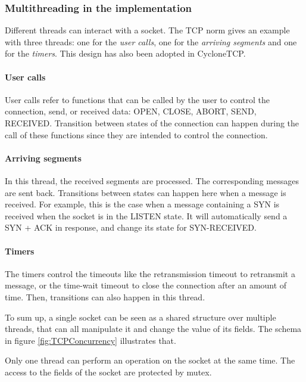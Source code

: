 \documentclass[a4paper, 10pt]{article}
\begin{document}
    \subsubsection{Multithreading in the implementation}

    Different threads can interact with a socket. The TCP norm gives an example with
    three threads: one for the \emph{user calls}, one for the \emph{arriving segments}
    and one for the \emph{timers}. This design has also been adopted in CycloneTCP.
    
    \paragraph{User calls}
    User calls refer to functions that can be called by the user to control the connection,
    send, or received data: OPEN, CLOSE, ABORT, SEND, RECEIVED. Transition between states of
    the connection can happen during the call of these functions since they are intended to control
    the connection.

    \paragraph{Arriving segments}
    In this thread, the received segments are processed. The corresponding messages are sent back.
    Transitions between states can happen here when a message is received. For example,
    this is the case when a message containing a SYN is received when the socket is in
    the LISTEN state. It will automatically send a SYN + ACK in response, and change
    its state for SYN-RECEIVED.

    \paragraph{Timers}
    The timers control the timeouts like the retransmission timeout to retransmit a message, or
    the time-wait timeout to close the connection after an amount of time. Then, transitions can also
    happen in this thread.

    To sum up, a single socket can be seen as a shared structure over multiple threads, that can all
    manipulate it and change the value of its fields. The schema in figure \ref{fig:TCPConcurrency} illustrates that.
    
    Only one thread can perform an operation on the socket at the same time. The access to the fields of
    the socket are protected by mutex.
\end{document}
